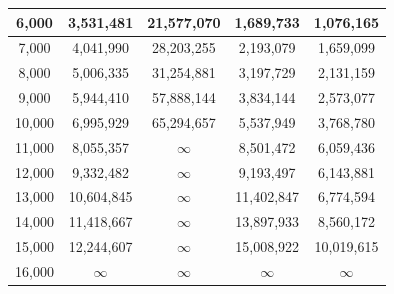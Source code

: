 \documentclass[12pt]{optlab-bachelor}
\begin{document}
\begin{table}[h]
{\begin{tabular}{|c|c|c|c|c|}
    6,000 &	3,531,481 &	21,577,070 &	1,689,733 &	1,076,165 \\ \hline
    7,000 &	4,041,990 &	28,203,255 &	2,193,079 &	1,659,099 \\ \hline
    8,000 &	5,006,335 &	31,254,881 &	3,197,729 &	2,131,159 \\ \hline
    9,000 &	5,944,410 &	57,888,144 &	3,834,144 &	2,573,077 \\ \hline
    10,000 &	6,995,929 &	65,294,657 &	5,537,949 &	3,768,780 \\ \hline
    11,000 &	8,055,357	& $\infty$ &	8,501,472 &	6,059,436 \\ \hline
    12,000 &	9,332,482	& $\infty$ &	9,193,497 &	6,143,881 \\ \hline
    13,000 &	10,604,845	& $\infty$ &	11,402,847 &	6,774,594 \\ \hline
    14,000 &	11,418,667	& $\infty$ &	13,897,933 &	8,560,172 \\ \hline
    15,000 &	12,244,607	& $\infty$ &	15,008,922 &	10,019,615 \\ \hline
    16,000	& $\infty$	& $\infty$ & $\infty$ & $\infty$ \\ \hline
  \end{tabular}
  }
\end{table}
\end{document}

